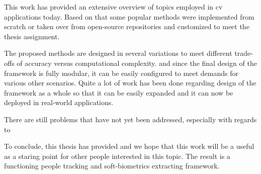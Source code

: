 \begin{conclusion}

This work has provided an extensive overview of topics employed in \gls{cv} applications today.
Based on that some popular methods were implemented from scratch or taken over from open-source repositories and customized to meet the thesis assignment.

The proposed methods are designed in several variations to meet different trade-offs of accuracy versus computational complexity. and since the final design of the framework is fully modular, it can be easily configured to meet demands for various other scenarios. Quite a lot of work has been done regarding design of the framework as a whole so that it can be easily expanded and it can now be deployed in real-world applications.

There are still problems that have not yet been addressed, especially with regards to 

To conclude, this thesis has provided 
and we hope that this work will be a useful as a staring point for other people interested in this topic. The result is a functioning people tracking and soft-biometrics extracting framework.

\end{conclusion}